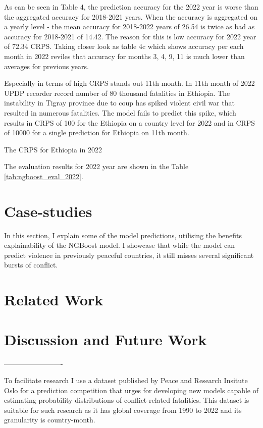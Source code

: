 \documentclass[runningheads]{llncs}
\begin{document}
    As can be seen in Table 4, the prediction accuracy for the 2022 year is worse than the aggregated accuracy for 2018-2021 years.
    When the accuracy is aggregated on a yearly level - the mean accuracy for 2018-2022 years of 26.54 is twice as bad as accuracy for 2018-2021 of 14.42.
    The reason for this is low accuracy for 2022 year of 72.34 CRPS. Taking closer look as table 4c which shows accuracy per each month in 2022 reviles that accuracy
    for months 3, 4, 9, 11 is much lower than averages for previous years.

    Especially in terms of high CRPS stands out 11th month.
    In 11th month of 2022 UPDP recorder record number of 80 thousand fatalities in Ethiopia.
    The instability in Tigray province due to coup has spiked violent civil war that resulted in numerous fatalities.
    The model fails to predict this spike, which results in CRPS of 100 for the Ethiopia on a country level for 2022 and in CRPS of 10000 for a single prediction for Ethiopia on 11th month.

    The CRPS for Ethiopia in 2022


    The evaluation results for 2022 year are shown in the Table \ref{tab:ngboost_eval_2022}.




    \section{Case-studies}
    In this section, I explain some of the model predictions, utilising the benefits explainability of the NGBoost model.
    I showcase that while the model can predict violence in previously peaceful countries, it still misses several significant bursts of conflict.



    \section{Related Work}


    \section{Discussion and Future Work}



    -------------------------

    To facilitate research I use a dataset published by Peace and Research Insitute Oslo for a prediction competition that urges for developing new models capable of estimating probability distributions of conflict-related fatalities. This dataset is suitable for such research as it has global coverage from 1990 to 2022 and its granularity is country-month.
\end{document}
